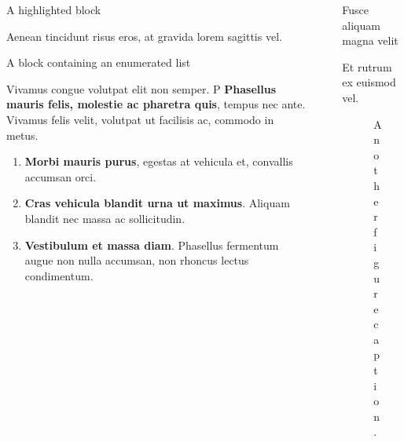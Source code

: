 \documentclass[final]{beamer}
\newlength{\sepwidth}
\newlength{\colwidth}
\newcommand{\separatorcolumn}{\begin{column}{\sepwidth}\end{column}}
\begin{document}
\begin{frame}[t]
\begin{columns}[t]
\begin{column}{\colwidth}
\begin{alertblock}{A highlighted block}
\begin{itemize}
    \end{itemize}

    Aenean tincidunt risus eros, at gravida lorem sagittis vel.

  \end{alertblock}



  \begin{block}{A block containing an enumerated list}

    Vivamus congue volutpat elit non semper. P \textbf{Phasellus mauris felis, molestie
    ac pharetra quis}, tempus nec ante. Vivamus felis velit, volutpat ut facilisis ac,
    commodo in metus.

    \begin{enumerate}
      \item \textbf{Morbi mauris purus}, egestas at vehicula et, convallis
        accumsan orci.
      \item \textbf{Cras vehicula blandit urna ut maximus}. Aliquam blandit nec
        massa ac sollicitudin.
      \item \textbf{Vestibulum et massa diam}. Phasellus fermentum augue non
        nulla accumsan, non rhoncus lectus condimentum.
    \end{enumerate}

  \end{block}
  
  \end{column}

\separatorcolumn

\begin{column}{\colwidth}

  \begin{block}{Fusce aliquam magna velit}

    Et rutrum ex euismod vel.

    \begin{figure}
      \centering
      \caption{Another figure caption.}
    \end{figure}


\end{block}
\end{column}
\end{columns}
\end{frame}
\end{document}
